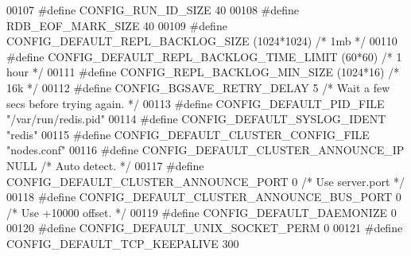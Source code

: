 \begin{DoxyCode}
00107 \textcolor{preprocessor}{#}\textcolor{preprocessor}{define} \textcolor{preprocessor}{CONFIG\_RUN\_ID\_SIZE} 40
00108 \textcolor{preprocessor}{#}\textcolor{preprocessor}{define} \textcolor{preprocessor}{RDB\_EOF\_MARK\_SIZE} 40
00109 \textcolor{preprocessor}{#}\textcolor{preprocessor}{define} \textcolor{preprocessor}{CONFIG\_DEFAULT\_REPL\_BACKLOG\_SIZE} \textcolor{preprocessor}{(}1024\textcolor{preprocessor}{*}1024\textcolor{preprocessor}{)}    \textcolor{comment}{/* 1mb */}
00110 \textcolor{preprocessor}{#}\textcolor{preprocessor}{define} \textcolor{preprocessor}{CONFIG\_DEFAULT\_REPL\_BACKLOG\_TIME\_LIMIT} \textcolor{preprocessor}{(}60\textcolor{preprocessor}{*}60\textcolor{preprocessor}{)}  \textcolor{comment}{/* 1 hour */}
00111 \textcolor{preprocessor}{#}\textcolor{preprocessor}{define} \textcolor{preprocessor}{CONFIG\_REPL\_BACKLOG\_MIN\_SIZE} \textcolor{preprocessor}{(}1024\textcolor{preprocessor}{*}16\textcolor{preprocessor}{)}          \textcolor{comment}{/* 16k */}
00112 \textcolor{preprocessor}{#}\textcolor{preprocessor}{define} \textcolor{preprocessor}{CONFIG\_BGSAVE\_RETRY\_DELAY} 5 \textcolor{comment}{/* Wait a few secs before trying again. */}
00113 \textcolor{preprocessor}{#}\textcolor{preprocessor}{define} \textcolor{preprocessor}{CONFIG\_DEFAULT\_PID\_FILE} \textcolor{stringliteral}{"/var/run/redis.pid"}
00114 \textcolor{preprocessor}{#}\textcolor{preprocessor}{define} \textcolor{preprocessor}{CONFIG\_DEFAULT\_SYSLOG\_IDENT} \textcolor{stringliteral}{"redis"}
00115 \textcolor{preprocessor}{#}\textcolor{preprocessor}{define} \textcolor{preprocessor}{CONFIG\_DEFAULT\_CLUSTER\_CONFIG\_FILE} \textcolor{stringliteral}{"nodes.conf"}
00116 \textcolor{preprocessor}{#}\textcolor{preprocessor}{define} \textcolor{preprocessor}{CONFIG\_DEFAULT\_CLUSTER\_ANNOUNCE\_IP} NULL         \textcolor{comment}{/* Auto detect. */}
00117 \textcolor{preprocessor}{#}\textcolor{preprocessor}{define} \textcolor{preprocessor}{CONFIG\_DEFAULT\_CLUSTER\_ANNOUNCE\_PORT} 0          \textcolor{comment}{/* Use server.port */}
00118 \textcolor{preprocessor}{#}\textcolor{preprocessor}{define} \textcolor{preprocessor}{CONFIG\_DEFAULT\_CLUSTER\_ANNOUNCE\_BUS\_PORT} 0      \textcolor{comment}{/* Use +10000 offset. */}
00119 \textcolor{preprocessor}{#}\textcolor{preprocessor}{define} \textcolor{preprocessor}{CONFIG\_DEFAULT\_DAEMONIZE} 0
00120 \textcolor{preprocessor}{#}\textcolor{preprocessor}{define} \textcolor{preprocessor}{CONFIG\_DEFAULT\_UNIX\_SOCKET\_PERM} 0
00121 \textcolor{preprocessor}{#}\textcolor{preprocessor}{define} \textcolor{preprocessor}{CONFIG\_DEFAULT\_TCP\_KEEPALIVE} 300

\end{DoxyCode}
